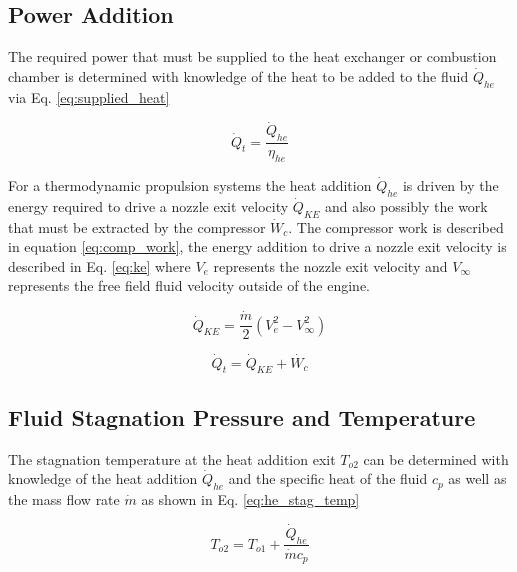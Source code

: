 \subsection{Power Addition}
The required power that must be supplied to the heat exchanger or combustion chamber is determined with knowledge of the heat to 
be added to the fluid $\dot{Q}_{he}$ via Eq. \ref{eq:supplied_heat}

\begin{equation}
\label{eq:supplied_heat}
\dot{Q}_{t} = \frac{\dot{Q}_{he}}{\eta_{he}}
\end{equation}

For a thermodynamic propulsion systems the heat addition $\dot{Q}_{he}$ is driven by the energy required to drive a nozzle
exit velocity $\dot{Q}_{KE}$ and also possibly the work that must be extracted by the compressor $\dot{W}_c$.  The compressor 
work is described in equation \ref{eq:comp_work}, the energy addition to drive a nozzle exit velocity is described in Eq. \ref{eq:ke}
where $V_e$ represents the nozzle exit velocity and $V_\infty$ represents the free field fluid velocity outside of the engine.

\begin{equation}
\label{eq:ke}
\dot{Q}_{KE} = \frac{\dot{m}}{2}\left(V^2_e-V^2_{\infty}\right)
\end{equation}

\begin{equation}
\label{eq:total_heat}
\dot{Q}_t = \dot{Q}_{KE} + \dot{W_c}
\end{equation}

\subsection{Fluid Stagnation Pressure and Temperature}

The stagnation temperature at the heat addition exit $T_{o2}$ can be determined with knowledge of the heat addition $\dot{Q}_{he}$ and the
specific heat of the fluid $c_p$ as well as the mass flow rate $\dot{m}$ as shown in Eq. \ref{eq:he_stag_temp}

\begin{equation}
\label{eq:he_stag_temp}
T_{o2} = T_{o1} + \frac{\dot{Q}_{he}}{\dot{m}c_p}
\end{equation}


